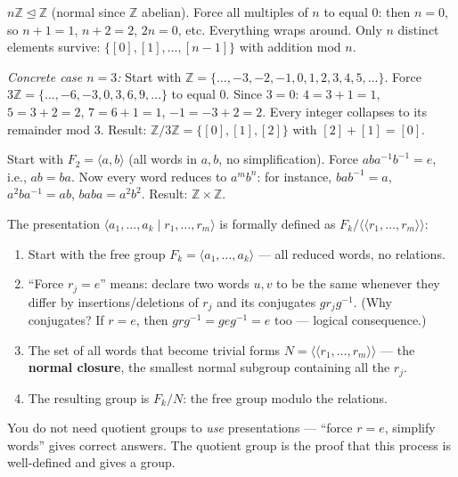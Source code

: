 \documentclass[11pt]{report}
\begin{document}
\begin{exbox}
$n\mathbb{Z} \trianglelefteq \mathbb{Z}$ (normal since $\mathbb{Z}$ abelian). Force all multiples of $n$ to equal $0$: then $n = 0$, so $n+1 = 1$, $n+2 = 2$, $2n = 0$, etc. Everything wraps around. Only $n$ distinct elements survive: $\{[0], [1], \ldots, [n-1]\}$ with addition mod $n$.

\textit{Concrete case $n = 3$:} Start with $\mathbb{Z} = \{\ldots, -3, -2, -1, 0, 1, 2, 3, 4, 5, \ldots\}$. Force $3\mathbb{Z} = \{\ldots, -6, -3, 0, 3, 6, 9, \ldots\}$ to equal $0$. Since $3 = 0$: $4 = 3+1 = 1$, $5 = 3+2 = 2$, $7 = 6+1 = 1$, $-1 = -3+2 = 2$. Every integer collapses to its remainder mod $3$. Result: $\mathbb{Z}/3\mathbb{Z} = \{[0], [1], [2]\}$ with $[2] + [1] = [0]$.
\end{exbox}

\begin{exbox}
Start with $F_2 = \langle a, b \rangle$ (all words in $a, b$, no simplification). Force $aba^{-1}b^{-1} = e$, i.e., $ab = ba$. Now every word reduces to $a^m b^n$: for instance, $bab^{-1} = a$, $a^2ba^{-1} = ab$, $baba = a^2b^2$. Result: $\mathbb{Z} \times \mathbb{Z}$.
\end{exbox}

\begin{rembox}
The presentation $\langle a_1, \ldots, a_k \mid r_1, \ldots, r_m \rangle$ is formally defined as $F_k / \langle\!\langle r_1, \ldots, r_m \rangle\!\rangle$:
\begin{enumerate}[nosep]
    \item Start with the free group $F_k = \langle a_1, \ldots, a_k \rangle$ --- all reduced words, no relations.
    \item ``Force $r_j = e$'' means: declare two words $u, v$ to be the same whenever they differ by insertions/deletions of $r_j$ and its conjugates $gr_jg^{-1}$. (Why conjugates? If $r = e$, then $grg^{-1} = geg^{-1} = e$ too --- logical consequence.)
    \item The set of all words that become trivial forms $N = \langle\!\langle r_1, \ldots, r_m \rangle\!\rangle$ --- the \textbf{normal closure}, the smallest normal subgroup containing all the $r_j$.
    \item The resulting group is $F_k / N$: the free group modulo the relations.
\end{enumerate}
You do not need quotient groups to \emph{use} presentations --- ``force $r = e$, simplify words'' gives correct answers. The quotient group is the proof that this process is well-defined and gives a group.
\end{rembox}
\end{document}
